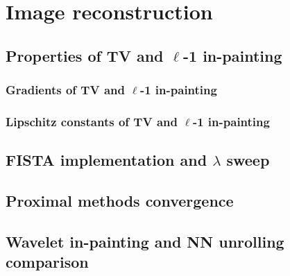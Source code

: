 \documentclass[12pt]{article}
\begin{document}
\section{Image reconstruction}
\subsection{Properties of TV and \texorpdfstring{$\ell$}{Lg}-1 in-painting}
\subsubsection{Gradients of TV and \texorpdfstring{$\ell$}{Lg}-1 in-painting}

\subsubsection{Lipschitz constants of TV and \texorpdfstring{$\ell$}{Lg}-1 in-painting}

\subsection{FISTA implementation and \texorpdfstring{$\lambda$}{Lg} sweep}

\subsection{Proximal methods convergence}

\subsection{Wavelet in-painting and NN unrolling comparison}
\end{document}
